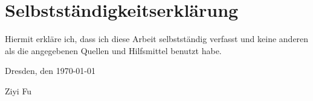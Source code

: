 
\section*{\vfill{} \thispagestyle{empty}
Selbstständigkeitserklärung}

Hiermit erkläre ich, dass ich diese Arbeit selbstständig verfasst
und keine anderen als die angegebenen Quellen und Hilfsmittel benutzt habe.
\bigskip{}

\noindent Dresden, den \today %
\vspace{2.5cm}

\noindent Ziyi Fu \cleardoublepage{}
